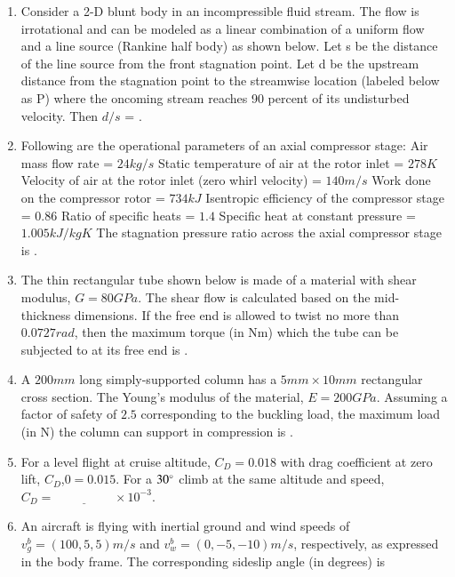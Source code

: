 \documentclass{article}
\begin{document}
\begin{enumerate}
\item Consider a 2-D blunt body in an incompressible fluid stream. The flow is irrotational and can be modeled as a linear combination of a uniform flow and a line source (Rankine half body) as shown below. Let s be the distance of the line source from the front stagnation point. Let d be the upstream distance from the stagnation point to the streamwise location (labeled below as P) where the oncoming stream reaches 90 percent of its undisturbed velocity. Then $d/s$ = \underline{\hspace{2cm}}.


\item Following are the operational parameters of an axial compressor stage:
Air mass flow rate = $24 kg/s$
Static temperature of air at the rotor inlet = $278 K$
Velocity of air at the rotor inlet (zero whirl velocity) = $140 m/s$
Work done on the compressor rotor = $734 kJ$
Isentropic efficiency of the compressor stage = $0.86$
Ratio of specific heats = $1.4$
Specific heat at constant pressure = $1.005 kJ/kgK$
The stagnation pressure ratio across the axial compressor stage is \underline{\hspace{2cm}}.

\item The thin rectangular tube shown below is made of a material with shear modulus, $G = 80 GPa$. The shear flow is calculated based on the mid-thickness dimensions. If the free end is allowed to twist no more than $0.0727 rad$, then the maximum torque (in Nm) which the tube can be subjected to at its free end is \underline{\hspace{2cm}}.


\item A $200 mm$ long simply-supported column has a $5 mm \times 10 mm$ rectangular cross section. The Young's modulus of the material, $E = 200 GPa$. Assuming a factor of safety of $2.5$ corresponding to the buckling load, the maximum load (in N) the column can support in compression is \underline{\hspace{2cm}}.


\item For a level flight at cruise altitude, $C_D = 0.018$ with drag coefficient at zero lift, $C_D$,$0 = 0.015$. For a $30\degree$ climb at the same altitude and speed, $C_D = \underline{\hspace{2cm}} \times 10^{-3}$.


\item An aircraft is flying with inertial ground and wind speeds of $v_g^b = (100, 5, 5) m/s$ and $v_w^b = (0, -5, -10) m/s$, respectively, as expressed in the body frame. The corresponding sideslip angle (in degrees) is


\end{enumerate}
\end{document}
